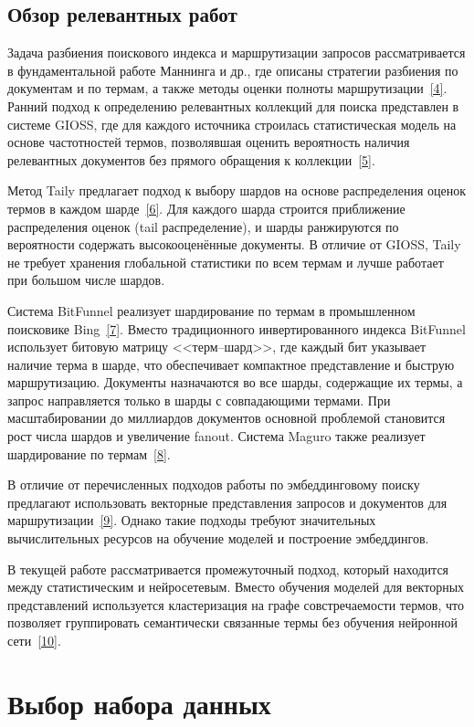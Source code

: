 \documentclass[14pt, a4paper]{article}
\newcommand{\srcref}[1]{\hyperlink{src:i#1}{[#1]}}
\begin{document}
	\subsection{Обзор релевантных работ}

	Задача разбиения поискового индекса и маршрутизации запросов рассматривается в фундаментальной работе Маннинга и др., где описаны стратегии разбиения по документам и по термам, а также методы оценки полноты маршрутизации~\srcref{4}.
	Ранний подход к определению релевантных коллекций для поиска представлен в системе GIOSS, где для каждого источника строилась статистическая модель на основе частотностей термов, позволявшая оценить вероятность наличия релевантных документов без прямого обращения к коллекции~\srcref{5}.

	Метод Taily предлагает подход к выбору шардов на основе распределения оценок термов в каждом шарде~\srcref{6}.
	Для каждого шарда строится приближение распределения оценок (tail распределение), и шарды ранжируются по вероятности содержать высокооценённые документы.
	В отличие от GIOSS, Taily не требует хранения глобальной статистики по всем термам и лучше работает при большом числе шардов.

	Система BitFunnel реализует шардирование по термам в промышленном поисковике Bing~\srcref{7}.
	Вместо традиционного инвертированного индекса BitFunnel использует битовую матрицу <<терм--шард>>, где каждый бит указывает наличие терма в шарде, что обеспечивает компактное представление и быструю маршрутизацию.
	Документы назначаются во все шарды, содержащие их термы, а запрос направляется только в шарды с совпадающими термами.
	При масштабировании до миллиардов документов основной проблемой становится рост числа шардов и увеличение fanout.
	Система Maguro также реализует шардирование по термам~\srcref{8}.

	В отличие от перечисленных подходов работы по эмбеддинговому поиску предлагают использовать векторные представления запросов и документов для маршрутизации~\srcref{9}.
	Однако такие подходы требуют значительных вычислительных ресурсов на обучение моделей и построение эмбеддингов.

	В текущей работе рассматривается промежуточный подход, который находится между статистическим и нейросетевым.
	Вместо обучения моделей для векторных представлений используется кластеризация на графе совстречаемости термов, что позволяет группировать семантически связанные термы без обучения нейронной сети~\srcref{10}.

	\clearpage
	\section{Выбор набора данных}
\end{document}
